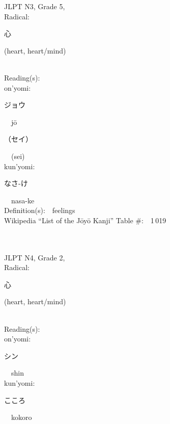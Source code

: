 \begin{multicols}{2}
{JLPT N3, Grade 5, \\Radical:\ \ {\begin{CJK}{UTF8}{min} 心 \end{CJK}} (heart, heart/mind) } \\
Reading(s):\ \ \\
{\hspace*{1em}}on'yomi:\ \ \\
{\hspace*{2em}}{\begin{CJK}{UTF8}{min} ジョウ \end{CJK}}\ \ j\=o\ \ \\
{\hspace*{2em}}{\begin{CJK}{UTF8}{min} （セイ） \end{CJK}}\ \ (sei)\ \ \\
{\hspace*{1em}}kun'yomi:\ \ \\
{\hspace*{2em}}{\begin{CJK}{UTF8}{min} なさ-け \end{CJK}}\ \ nasa-ke\ \ \\
Definition(s):\ \ feelings \\
Wikipedia ``List of the J\=oy\=o Kanji'' Table \#:\ \ 1\,019 \\
\ \ \\
{\fontsize{34pt}{40pt}  }\ \ \\  %
{JLPT N4, Grade 2, \\Radical:\ \ {\begin{CJK}{UTF8}{min} 心 \end{CJK}} (heart, heart/mind) } \\
Reading(s):\ \ \\
{\hspace*{1em}}on'yomi:\ \ \\
{\hspace*{2em}}{\begin{CJK}{UTF8}{min} シン \end{CJK}}\ \ shin\ \ \\
{\hspace*{1em}}kun'yomi:\ \ \\
{\hspace*{2em}}{\begin{CJK}{UTF8}{min} こころ \end{CJK}}\ \ kokoro\ \ \\

\end{multicols}
